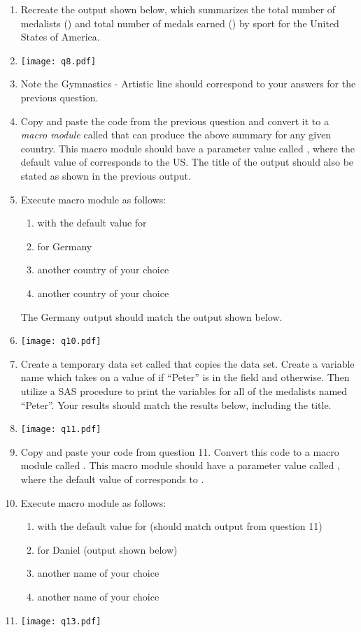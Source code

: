 \begin{enumerate}
\item Recreate the output shown below, which summarizes the total number of medalists () and total number of medals earned () by sport for the United States of America.
\item[]\texttt{[image: q8.pdf]}
\item[] Note the Gymnastics - Artistic line should correspond to your answers for the previous question.
\item Copy and paste the code from the previous question and convert it to a \emph{macro module} called  that can produce the above summary for any given country.  This macro module should have a  parameter value called , where the default value of  corresponds to the US.  The title of the output should also be stated as shown in the previous output.
\item Execute  macro module as follows:
\begin{enumerate}
\item with the default value for 
\item for Germany
\item another country of your choice
\item another country of your choice
\end{enumerate}
The Germany output should match the output shown below.
\item[]\texttt{[image: q10.pdf]}
\item Create a temporary data set called  that copies the  data set.  Create a variable name  which takes on a value of  if ``Peter'' is in the  field and  otherwise.  Then utilize a SAS procedure to print the variables  for all of the medalists named ``Peter''.  Your results should match the results below, including the title.
\item[]\texttt{[image: q11.pdf]}
\item Copy and paste your code from question 11.  Convert this code to a macro module called . This macro module should have a  parameter value called , where the default value of  corresponds to .
\item Execute  macro module as follows:
\begin{enumerate}
\item with the default value for  (should match output from question 11)
\item for Daniel (output shown below)
\item another name of your choice
\item another name of your choice
\end{enumerate}
\item[]\texttt{[image: q13.pdf]}
\end{enumerate}
 
